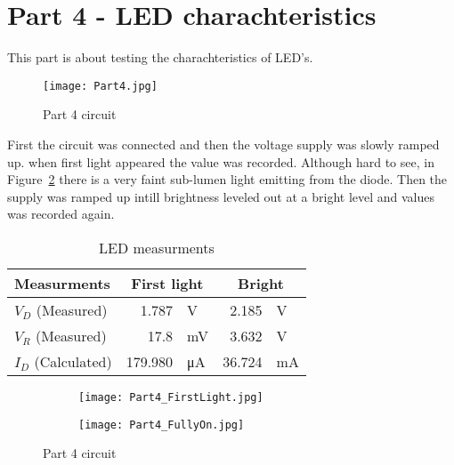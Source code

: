 \documentclass{article}
\begin{document}
\section{Part 4 - LED charachteristics}
This part is about testing the charachteristics of LED's. 


\begin{figure}[h]
    \centering
    \texttt{[image: Part4.jpg]}
    \caption{Part 4 circuit}
    \label{fig:Part4}
\end{figure}

First the circuit was connected and then the voltage supply was slowly ramped up. when first light appeared the value was recorded. Although hard to see, in Figure~\ref{fig:FirstLight} there is a very faint sub-lumen light emitting from the diode. Then the supply was ramped up intill brightness leveled out at a bright level and values was recorded again.

\clearpage


\begin{table}[htbp]
  \centering
  \caption{LED measurments}
    \begin{tabular}{|l|rl|rl|}
    \hline
    Measurments & \multicolumn{2}{c|}{First light} & \multicolumn{2}{c|}{Bright} \bigstrut\\
    \hline
    \(V_D\) (Measured)   & 1.787   & V   & 2.185  & V \bigstrut\\
    \hline
    \(V_R\) (Measured)   & 17.8    & mV  & 3.632  & V \bigstrut\\
    \hline
    \(I_D\) (Calculated) & 179.980 & μA  & 36.724 & mA \bigstrut\\
    \hline
    \end{tabular}%
  \label{tab:part4}%
\end{table}%

\vspace{2em}


\begin{figure}[h]
    \centering
    \begin{subfigure}[t]{0.49\textwidth}
        \centering
        \texttt{[image: Part4\_FirstLight.jpg]}
        \label{fig:FirstLight}
    \end{subfigure}
    \hfill
    \begin{subfigure}[t]{0.49\textwidth}
        \centering
        \texttt{[image: Part4\_FullyOn.jpg]}
        \label{fig:Bright}
    \end{subfigure}
    \caption{Part 4 circuit}
    \label{fig:Part4States}
\end{figure}
\end{document}
